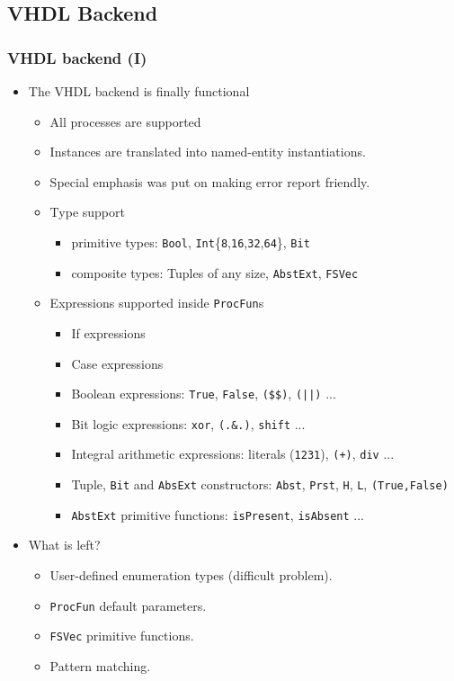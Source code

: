 \documentclass{beamer}
\begin{document}
\subsection{VHDL Backend}
\begin{frame}
  \frametitle{VHDL backend (I)}
\vspace{-0.2cm}
\begin{itemize}
\item The VHDL backend is finally functional
  \begin{itemize}
  \item All processes are supported
  \item Instances are translated into named-entity instantiations.
  \item Special emphasis was put on making error report friendly.
  \item Type support
    \begin{itemize}
    \item primitive types:
      \texttt{Bool}, \texttt{Int}\{\texttt{8},\texttt{16},\texttt{32},\texttt{64}\}, \texttt{Bit}
    \item composite types: 
      Tuples of any size, \texttt{AbstExt}, \texttt{FSVec}
    \end{itemize}
  \item Expressions supported inside \texttt{ProcFun}s
    \begin{itemize}
    \item If expressions
    \item Case expressions
    \item Boolean expressions: \texttt{True}, \texttt{False}, \texttt{(\$\$)}, \texttt{(||)} ...      
    \item Bit logic expressions: \texttt{xor}, \texttt{(.\&.)}, \texttt{shift} ...
    \item Integral arithmetic expressions: literals (\texttt{1231}), \texttt{(+)}, \texttt{div} ...
    \item Tuple, \texttt{Bit} and \texttt{AbsExt} constructors: \texttt{Abst}, \texttt{Prst}, \texttt{H}, \texttt{L}, \texttt{(True,False)}
    \item \texttt{AbstExt} primitive functions: \texttt{isPresent}, \texttt{isAbsent} ...
    \end{itemize}
  \end{itemize}
\item What is left?
  \begin{itemize}
  \item User-defined enumeration types (difficult problem).
  \item \texttt{ProcFun} default parameters.
  \item \texttt{FSVec} primitive functions.
  \item Pattern matching.
  \end{itemize}
\end{itemize}
\end{frame}
\end{document}

